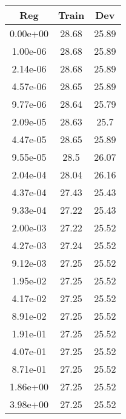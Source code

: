 \documentclass[letter,12pt]{article}
\begin{document}
\begin{table}[!h!p]
\begin{center}
\begin{tabular}{c c c}
\hline\hline
Reg & Train & Dev \\
\hline
0.00e+00 & 28.68 & 25.89 \\
1.00e-06 & 28.68 & 25.89 \\
2.14e-06 & 28.68 & 25.89 \\
4.57e-06 & 28.65 & 25.89 \\
9.77e-06 & 28.64 & 25.79 \\
2.09e-05 & 28.63 & 25.7 \\
4.47e-05 & 28.65 & 25.89 \\
9.55e-05 & 28.5 & 26.07 \\
2.04e-04 & 28.04 & 26.16 \\
4.37e-04 & 27.43 & 25.43 \\
9.33e-04 & 27.22 & 25.43 \\
2.00e-03 & 27.22 & 25.52 \\
4.27e-03 & 27.24 & 25.52 \\
9.12e-03 & 27.25 & 25.52 \\
1.95e-02 & 27.25 & 25.52 \\
4.17e-02 & 27.25 & 25.52 \\
8.91e-02 & 27.25 & 25.52 \\
1.91e-01 & 27.25 & 25.52 \\
4.07e-01 & 27.25 & 25.52 \\
8.71e-01 & 27.25 & 25.52 \\
1.86e+00 & 27.25 & 25.52 \\
3.98e+00 & 27.25 & 25.52 \\
\hline\hline
\end{tabular}
\end{center}
\end{table}
\end{document}
